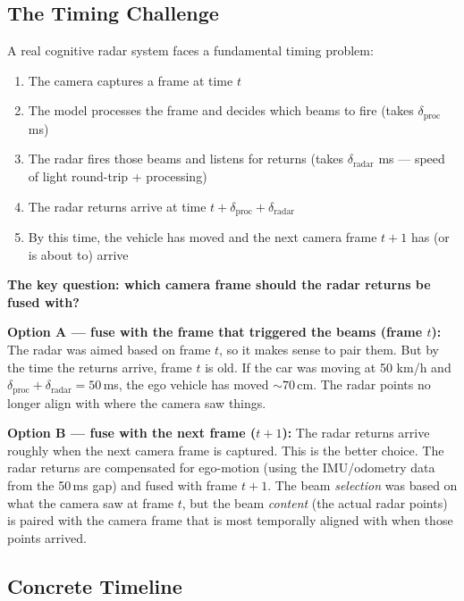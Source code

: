 \documentclass[12pt, a4paper]{article}
\theoremstyle{definition}
\begin{document}
\subsection{The Timing Challenge}

A real cognitive radar system faces a fundamental timing problem:

\begin{enumerate}
  \item The camera captures a frame at time $t$
  \item The model processes the frame and decides which beams to fire
        (takes $\delta_\mathrm{proc}$ ms)
  \item The radar fires those beams and listens for returns
        (takes $\delta_\mathrm{radar}$ ms --- speed of light round-trip + processing)
  \item The radar returns arrive at time $t + \delta_\mathrm{proc} + \delta_\mathrm{radar}$
  \item By this time, the vehicle has moved and the next camera frame $t+1$
        has (or is about to) arrive
\end{enumerate}

\begin{plainbox}
\textbf{The key question: which camera frame should the radar returns be fused with?}

\textbf{Option A --- fuse with the frame that triggered the beams (frame $t$):}
The radar was aimed based on frame $t$, so it makes sense to pair them.
But by the time the returns arrive, frame $t$ is old.
If the car was moving at 50 km/h and $\delta_\mathrm{proc}+\delta_\mathrm{radar}=50$\,ms,
the ego vehicle has moved $\sim70$\,cm. The radar points no longer align with
where the camera saw things.

\textbf{Option B --- fuse with the next frame ($t+1$):}
The radar returns arrive roughly when the next camera frame is captured.
This is the better choice. The radar returns are compensated for ego-motion
(using the IMU/odometry data from the 50\,ms gap) and fused with frame $t+1$.
The beam \emph{selection} was based on what the camera saw at frame $t$,
but the beam \emph{content} (the actual radar points) is paired with the
camera frame that is most temporally aligned with when those points arrived.
\end{plainbox}

\subsection{Concrete Timeline}
\end{document}
